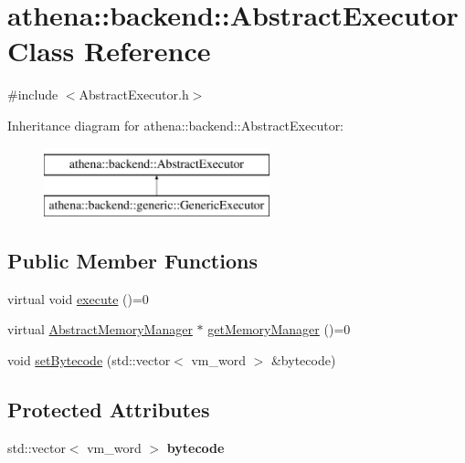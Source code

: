 \hypertarget{classathena_1_1backend_1_1_abstract_executor}{}\section{athena\+:\+:backend\+:\+:Abstract\+Executor Class Reference}
\label{classathena_1_1backend_1_1_abstract_executor}


{\ttfamily \#include $<$Abstract\+Executor.\+h$>$}

Inheritance diagram for athena\+:\+:backend\+:\+:Abstract\+Executor\+:\begin{figure}[H]
\begin{center}
\leavevmode
\includegraphics[height=2.000000cm]{d5/d1e/classathena_1_1backend_1_1_abstract_executor}
\end{center}
\end{figure}
\subsection*{Public Member Functions}
\begin{DoxyCompactItemize}
\item 
virtual void \mbox{\hyperlink{classathena_1_1backend_1_1_abstract_executor_a5f179146ae76002b678a4862553f87ce}{execute}} ()=0
\item 
virtual \mbox{\hyperlink{classathena_1_1backend_1_1_abstract_memory_manager}{Abstract\+Memory\+Manager}} $\ast$ \mbox{\hyperlink{classathena_1_1backend_1_1_abstract_executor_a6d61486e2a06500c9c0aa1e03a475e4a}{get\+Memory\+Manager}} ()=0
\item 
void \mbox{\hyperlink{classathena_1_1backend_1_1_abstract_executor_afa06d9875ee6c53986873f29db380893}{set\+Bytecode}} (std\+::vector$<$ vm\+\_\+word $>$ \&bytecode)
\end{DoxyCompactItemize}
\subsection*{Protected Attributes}
\begin{DoxyCompactItemize}
\item 
\mbox{\label{classathena_1_1backend_1_1_abstract_executor_a948d95ced27de4fb3445ef341a4b9035}} 
std\+::vector$<$ vm\+\_\+word $>$ {\bfseries bytecode}
\end{DoxyCompactItemize}



